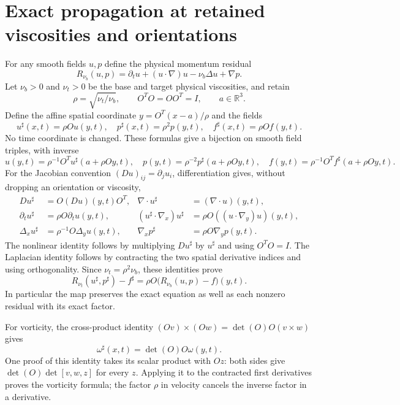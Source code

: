 \section{Exact propagation at retained viscosities and orientations}
\label{nsprop:map}
For any smooth fields $u,p$ define the physical momentum residual
\[
 R_{\nu_b}(u,p)=\partial_tu+(u\cdot\nabla)u-\nu_b\Delta u+\nabla p.
\]
Let $\nu_b>0$ and $\nu_t>0$ be the base and target physical viscosities,
and retain
\[
 \rho=\sqrt{\nu_t/\nu_b},\qquad O^TO=OO^T=I,\qquad a\in\mathbb R^3.
\]
Define the affine spatial coordinate $y=O^T(x-a)/\rho$ and the fields
\begin{equation}
 u^\sharp(x,t)=\rho O u(y,t),\quad
 p^\sharp(x,t)=\rho^2p(y,t),\quad
 f^\sharp(x,t)=\rho O f(y,t).
 \label{nsprop:affine_map}
\end{equation}
No time coordinate is changed. These formulas give a bijection on smooth
field triples, with inverse
\[
 u(y,t)=\rho^{-1}O^Tu^\sharp(a+\rho Oy,t),\quad
 p(y,t)=\rho^{-2}p^\sharp(a+\rho Oy,t),\quad
 f(y,t)=\rho^{-1}O^Tf^\sharp(a+\rho Oy,t).
\]
For the Jacobian convention $(Du)_{ij}=\partial_j u_i$, differentiation
gives, without dropping an orientation or viscosity,
\begin{align*}
 Du^\sharp&=O(Du)(y,t)O^T,&
 \nabla\cdot u^\sharp&=(\nabla\cdot u)(y,t),\\
 \partial_tu^\sharp&=\rho O\partial_tu(y,t),&
 (u^\sharp\cdot\nabla_x)u^\sharp&=\rho O((u\cdot\nabla_y)u)(y,t),\\
 \Delta_xu^\sharp&=\rho^{-1}O\Delta_yu(y,t),&
 \nabla_xp^\sharp&=\rho O\nabla_yp(y,t).
\end{align*}
The nonlinear identity follows by multiplying $Du^\sharp$ by
$u^\sharp$ and using $O^TO=I$. The Laplacian identity follows by
contracting the two spatial derivative indices and using orthogonality.
Since $\nu_t=\rho^2\nu_b$, these identities prove
\begin{equation}
 R_{\nu_t}(u^\sharp,p^\sharp)-f^\sharp
       =\rho O\bigl(R_{\nu_b}(u,p)-f\bigr)(y,t).
 \label{nsprop:residual_map}
\end{equation}
In particular the map preserves the exact equation as well as each
nonzero residual with its exact factor.

For vorticity, the cross-product identity
$(Ov)\times(Ow)=\det(O)O(v\times w)$ gives
\begin{equation}
 \omega^\sharp(x,t)=\det(O)O\omega(y,t).
 \label{nsprop:vorticity}
\end{equation}
One proof of this identity takes its scalar product with $Oz$:
both sides give $\det(O)\det[v,w,z]$ for every $z$. Applying it to
the contracted first derivatives proves the vorticity formula; the
factor $\rho$ in velocity cancels the inverse factor in a derivative.

